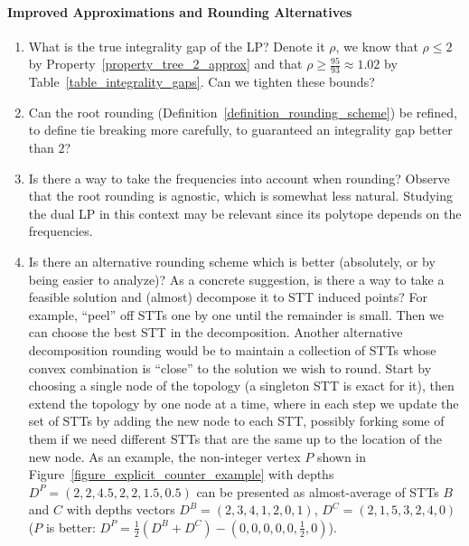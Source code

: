 \paragraph{Improved Approximations and Rounding Alternatives}
\begin{enumerate}
    \item What is the true integrality gap of the LP? Denote it $\rho$, we know that $\rho \le 2$ by Property~\ref{property_tree_2_approx} and that $\rho \ge \frac{95}{93} \approx 1.02$ by Table~\ref{table_integrality_gaps}. Can we tighten these bounds?

    \item Can the root rounding (Definition~\ref{definition_rounding_scheme}) be refined, to define tie breaking more carefully, to guaranteed an integrality gap better than $2$?

    \item Is there a way to take the frequencies into account when rounding? Observe that the root rounding is agnostic, which is somewhat less natural. Studying the dual LP in this context may be relevant since its polytope depends on the frequencies.
    

    \item \label{item_peeling} Is there an alternative rounding scheme which is better (absolutely, or by being easier to analyze)? As a concrete suggestion, is there a way to take a feasible solution and (almost) decompose it to STT induced points? For example, ``peel'' off STTs one by one until the remainder is small. Then we can choose the best STT in the decomposition. Another alternative decomposition rounding would be to maintain a collection of STTs whose convex combination is ``close'' to the solution we wish to round. Start by choosing a single node of the topology (a singleton STT is exact for it), then extend the topology by one node at a time, where in each step we update the set of STTs by adding the new node to each STT, possibly forking some of them if we need different STTs that are the same up to the location of the new node. As an example, the non-integer vertex $P$ shown in Figure~\ref{figure_explicit_counter_example} with depths $D^P = (2,2,4.5,2,2,1.5,0.5)$ can be presented as almost-average of STTs $B$ and $C$ with depths vectors $D^B = (2,3,4,1,2,0,1)$, $D^C = (2,1,5,3,2,4,0)$ ($P$ is better: $D^P = \frac{1}{2}(D^B+D^C) - (0,0,0,0,0,\frac{1}{2},0)$).


\end{enumerate}
